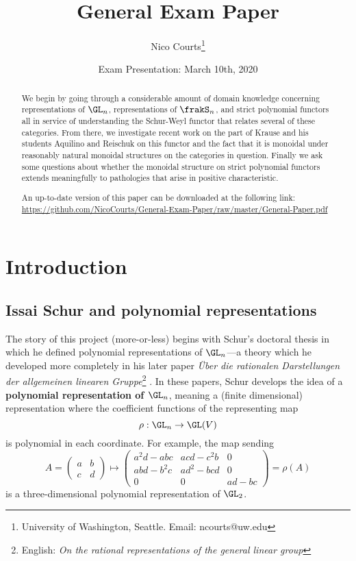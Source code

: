 \documentclass[12pt]{article}
\begin{document}
\title{General Exam Paper \vspace{-1ex}}
\author{Nico Courts\footnote{University of Washington, Seattle. Email: ncourts@uw.edu}}
\date{Exam Presentation: March 10th, 2020}
\maketitle

\begin{abstract}
	We begin by going through a considerable amount of domain knowledge concerning representations of $\GL_n$,
	representations of $\frakS_n$, and strict polynomial functors all in service of understanding the Schur-Weyl 
	functor that relates several of these categories. From there, we investigate recent work on the part of Krause 
	and his students Aquilino and Reischuk on this functor and the fact that it is monoidal under reasonably natural monoidal structures on 
	the categories in question. Finally we ask some questions about whether the monoidal structure on strict polynomial functors 
	extends meaningfully to pathologies that arise in positive characteristic.

	{\footnotesize An up-to-date version of this paper can be downloaded at the following link: \url{https://github.com/NicoCourts/General-Exam-Paper/raw/master/General-Paper.pdf}}
\end{abstract}

\newpage
\renewcommand{\baselinestretch}{0.75}\normalsize
\setcounter{tocdepth}{3}
\tableofcontents
\renewcommand{\baselinestretch}{1.0}\normalsize

\newpage
\section{Introduction}
\subsection{Issai Schur and polynomial representations}
The story of this project (more-or-less) begins with Schur's doctoral thesis \cite{schur-thesis} in which he defined
polynomial representations of $\GL_n$---a theory which he developed more completely in his later paper \textit{\"Uber die 
rationalen Darstellungen der allgemeinen linearen Gruppe}\footnote{English: \textit{On the rational representations of the general linear group}}
\cite{schur-rational}. In these papers, Schur develops the idea of a \textbf{polynomial representation of $\GL_n$},
meaning a (finite dimensional) representation where the coefficient functions of the representing map 
\[\rho:\GL_n\to \GL(V)\]
is polynomial in each coordinate. For example, the map sending 
\[A=\begin{pmatrix}
	a&b\\
	c&d
\end{pmatrix}\mapsto \begin{pmatrix}
	a^2d-abc & acd-c^2b & 0\\
	abd-b^2c & ad^2-bcd & 0\\
	0 & 0 & ad-bc
\end{pmatrix}=\rho(A)\]
is a three-dimensional polynomial representation of $\GL_2$.
\end{document}
